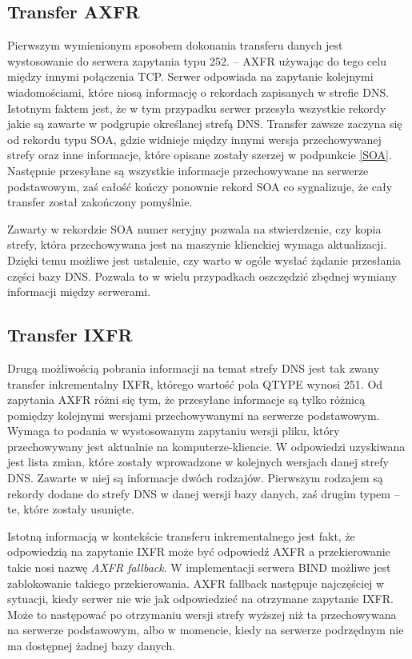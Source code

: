 \subsection{Transfer AXFR}
Pierwszym wymienionym sposobem dokonania transferu danych jest wystosowanie do serwera zapytania typu 252. -- AXFR\cite{RFC5936} używając do tego celu między innymi połączenia TCP. Serwer odpowiada na zapytanie kolejnymi wiadomościami, które niosą informację o rekordach zapisanych w strefie DNS. Istotnym faktem jest, że w tym przypadku serwer przesyła wszystkie rekordy jakie są zawarte w podgrupie określanej strefą DNS. Transfer zawsze zaczyna się od rekordu typu SOA, gdzie widnieje między innymi wersja przechowywanej strefy oraz inne informacje, które opisane zostały szerzej w podpunkcie \ref{SOA}. Następnie przesyłane są wszystkie informacje przechowywane na serwerze podstawowym, zaś całość kończy ponownie rekord SOA co sygnalizuje, że cały transfer został zakończony pomyślnie.

Zawarty w rekordzie SOA numer seryjny pozwala na stwierdzenie, czy kopia strefy, która przechowywana jest na maszynie klienckiej wymaga aktualizacji. Dzięki temu możliwe jest ustalenie, czy warto w ogóle wysłać żądanie przesłania części bazy DNS. Pozwala to w wielu przypadkach oszczędzić zbędnej wymiany informacji między serwerami.

\subsection{Transfer IXFR}
Drugą możliwością pobrania informacji na temat strefy DNS jest tak zwany transfer inkrementalny IXFR, którego wartość pola QTYPE wynosi 251. Od zapytania AXFR różni się tym, że przesyłane informacje są tylko różnicą pomiędzy kolejnymi wersjami przechowywanymi na serwerze podstawowym. Wymaga to podania w wystosowanym zapytaniu wersji pliku, który przechowywany jest aktualnie na komputerze-kliencie. W odpowiedzi uzyskiwana jest lista zmian, które zostały wprowadzone w kolejnych wersjach danej strefy DNS. Zawarte w niej są informacje dwóch rodzajów. Pierwszym rodzajem są rekordy dodane do strefy DNS w danej wersji bazy danych, zaś drugim typem -- te, które zostały usunięte.

Istotną informacją w kontekście transferu inkrementalnego jest fakt, że odpowiedzią na zapytanie IXFR może być odpowiedź AXFR a przekierowanie takie nosi nazwę \textit{AXFR fallback}. W implementacji serwera BIND\cite{isc} możliwe jest zablokowanie takiego przekierowania. AXFR fallback następuje najczęściej w sytuacji, kiedy serwer nie wie jak odpowiedzieć na otrzymane zapytanie IXFR. Może to następować po otrzymaniu wersji strefy wyższej niż ta przechowywana na serwerze podstawowym, albo w momencie, kiedy na serwerze podrzędnym nie ma dostępnej żadnej bazy danych\cite{I-D.song-dnsop-ixfr-fallback}.



